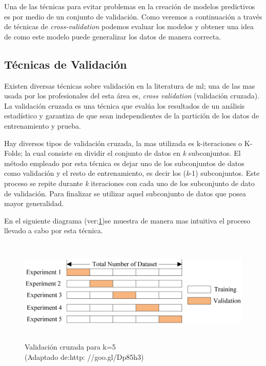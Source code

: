 Una de las técnicas para evitar problemas en la creación de modelos predictivos es por medio de un conjunto de validación. Como veremos a continuación a través de técnicas de \textit{cross-validation} podemos evaluar los modelos y obtener una idea de como este modelo puede generalizar los datos de manera correcta.

\subsection{Técnicas de Validación}\label{sub:tecnicasvalidacion}
Existen diversas técnicas sobre validación en la literatura de \ac{ml}; una de las mas usada por los profesionales del esta área es, \textit{cross validation} (validación cruzada). La validación cruzada es una técnica que evalúa los resultados de un análisis estadístico y garantiza de que sean independientes de la partición de los datos de entrenamiento y prueba. 

Hay diversos tipos de validación cruzada, la mas utilizada es k-iteraciones o K-Folds; la cual consiste en dividir el conjunto de datos en \textit{k} subconjuntos. El método empleado por esta técnica es dejar uno de los subconjuntos de datos como validación y el resto de entrenamiento, es decir los (\textit{k}-1) subconjuntos. Este proceso se repite durante \textit{k} iteraciones con cada uno de los subconjunto de dato de validación. Para finalizar se utilizar aquel subconjunto de datos que posea mayor generalidad.

En el siguiente diagrama (ver:\ref{Fig: crossvalidation})se muestra de manera mas intuitiva el proceso llevado a cabo por esta técnica.

\begin{figure}[H]
 \centering
  \includegraphics[height=5cm,keepaspectratio=true,clip=true]{imagenes/Logos/crossvalidat.png}
  \caption{Validación cruzada para k=5\\(Adaptado de:{http: //goo.gl/Dp85h3})}
	\label{Fig: crossvalidation}
\end{figure}

